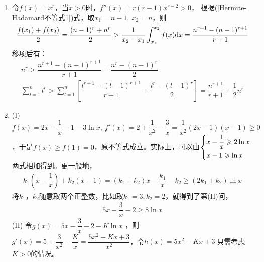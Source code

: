 \begin{enumerate}[label={\textbf{\arabic*.}},leftmargin=
    \inteval{\myenumleftmargin}pt]
即可得(\ref{凹凸性习题-伯努利不等式})式成立。\\
(5) $ p\e^{x_1}+q\e^{x_2}\geq \e^{px_1+qx_2} $，令$ \e^{x_1}=u_1>0 $，
$ \e^{x_2}=u_2>0 $，则只需证$ pu_1+qu_2\geq u_1^pu_2^q $，这就是(4)的结果。\\
(6) 
\begin{gather*}
    \dfrac{1}{4}(x_1^2+2+2\sqrt{x_1^2+2}\sqrt{x_2^2+2}+x_2^2+2)\geq 
    \dfrac{1}{4}(x_1^2+2x_1x_2+x_2^2)+2 \q \Leftrightarrow \\
    \sqrt{x_1^2+2}\sqrt{x_2^2+2}\geq x_1x_2+2 \q \text{(两边平方即可证明)}
\end{gather*}
(7) 要证$ \dfrac{1}{2}(x_1\ln x_1+x_2\ln x_2)\geq \dfrac{x_1+x_2}{2}
\ln \dfrac{x_1+x_2}{2} $，可以固定$ x_1 $，以$ x_2 $为变量，
然后对$ x_2 $求导，过程略。\\
(8)把(7)中的$ x_i $换成$ \e^{x_i} $即得。\\
请读者分别计算以上各个函数的二阶导数，并判断其正负号，再结合函数图像
体会二阶导数的正负与凹凸性的关系。

\item 
令$ f(x)=x^r $，当$ x>0 $时，$ f''(x)=r(r-1)x^{r-2}>0 $，
根据(\ref{Hermite-Hadamard不等式1})式，取$ x_1=n-1,\ x_2=n $，则
\begin{gather*}
    \dfrac{f(x_1)+f(x_2)}{2}=\dfrac{(n-1)^r+n^r}{2}>
    \dfrac{1}{x_2-x_1}\int_{x_1}^{x_2}f(x)\d x=\dfrac{n^{r+1}-(n-1)^{r+1}}{r+1}
\end{gather*}
移项后有：
\begin{gather*}
    n^r > \dfrac{n^{r+1}-(n-1)^{r+1}}{r+1}+\dfrac{n^{r}-(n-1)^{r}}{2} \\
    \sum\limits_{l=1}^n l^r>\sum_{l=1}^n
    \left[\dfrac{l^{r+1}-(l-1)^{r+1}}{r+1}+\dfrac{l^{r}-(l-1)^{r}}{2}\right]=
    \dfrac{n^{r+1}}{r+1}+\dfrac{1}{2}n^r
\end{gather*}

\item (I)
$ f(x)=2x-\dfrac{1}{x}-1-3\ln x,\ f'(x)=2+\dfrac{1}{x^2}-\dfrac{3}{x}=\dfrac{1}{x^2}
(2x-1)(x-1)\geq 0 $，于是$ f(x)\geq f(1)=0 $，原不等式成立。实际上，可以由$ \begin{dcases}
    x-\dfrac{1}{x} \geq 2\ln x\\
    x-1 \geq \ln x
\end{dcases}$两式相加得到。更一般地，
\begin{gather*}
    k_1\left(x-\dfrac{1}{x}\right)+k_2(x-1)=(k_1+k_2)x-\dfrac{k_1}{x}-k_2
    \geq (2k_1+k_2)\ln x 
\end{gather*}
将$k_1，k_2 $随意取两个正整数，比如取$ k_1=3,k_2=2 $，就得到了第(II)问，
\begin{gather*}
    5x-\dfrac{3}{x}-2\geq 8\ln x
\end{gather*}
(II) 令$ g(x)=5x-\dfrac{3}{x}-2-K\ln x$ ，则$ g'(x)=5+\dfrac{3}{x^2}-\dfrac{K}{x}=\dfrac{5x^2-Kx+3}{x^2} $，令$ h(x)=5x^2-Kx+3 $.只需考虑$ K>0 $的情况。 


\end{enumerate}
